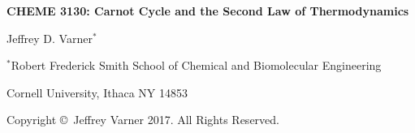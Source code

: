 \documentclass[11pt]{article}
\theoremstyle{definition}
\begin{document}
{\par\centering\textbf{\Large CHEME 3130: Carnot Cycle and the Second Law of Thermodynamics}}
\vspace{0.2in}
{\par \centering \large{Jeffrey D. Varner$^{*}$}}
\vspace{0.05in}
{\par \centering \large{$^{*}$}Robert Frederick Smith School of Chemical and Biomolecular Engineering}
{\par \centering \large{Cornell University, Ithaca NY 14853}}
\vspace{0.1in}
{\par \centering \small{Copyright \copyright\ Jeffrey Varner 2017. All Rights Reserved.}}\\

\date{}
\thispagestyle{empty}

\setcounter{page}{1}
\end{document}
